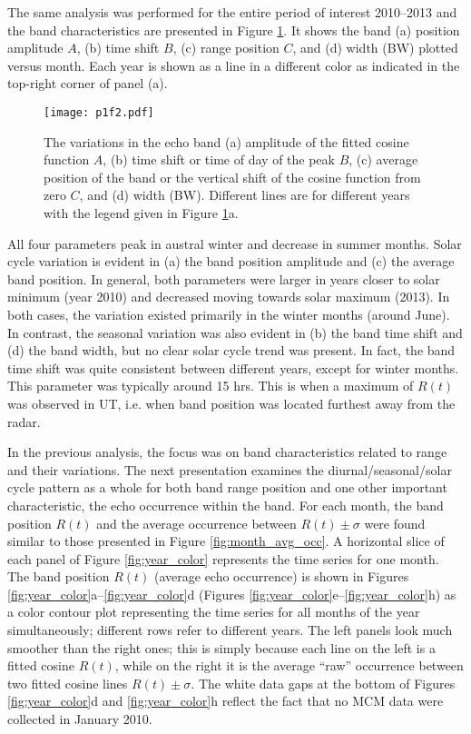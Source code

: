 The same analysis was performed for the entire period of interest 2010--2013 and the band characteristics are presented in Figure \ref{fig:year_line}. It shows the band (a) position amplitude \(A\), (b) time shift \(B\), (c) range position \(C\), and (d) width (BW) plotted versus month.  Each year is shown as a line in a different color as indicated in the top-right corner of panel (a).

\begin{figure}
\texttt{[image: p1f2.pdf]}
\caption{The variations in the echo band (a) amplitude of the fitted cosine function \(A\), (b) time shift or time of day of the peak \(B\), (c) average position of the band or the vertical shift of the cosine function from zero \(C\), and (d) width (BW). Different lines are for different years with the legend given in Figure \ref{fig:year_line}a.}
\label{fig:year_line}
\end{figure}

All four parameters peak in austral winter and decrease in summer months. Solar cycle variation is evident in (a) the band position amplitude and (c) the average band position. In general, both parameters were larger in years closer to solar minimum (year 2010) and decreased moving towards solar maximum (2013).  In both cases, the variation existed primarily in the winter months (around June). In contrast, the seasonal variation was also evident in (b) the band time shift and (d) the band width, but no clear solar cycle trend was present. In fact, the band time shift was quite consistent between different years, except for winter months. This parameter was typically around 15 hrs. This is when a maximum of \(R\left(t\right)\) was observed in UT, i.e. when band position was located furthest away from the radar.

In the previous analysis, the focus was on band characteristics related to range and their variations. The next presentation examines the diurnal/seasonal/solar cycle pattern as a whole for both band range position and one other important characteristic, the echo occurrence within the band. For each month, the band position \(R\left(t\right)\) and the average occurrence between \(R\left(t\right)\pm \sigma\) were found similar to those presented in Figure \ref{fig:month_avg_occ}. A horizontal slice of each panel of Figure \ref{fig:year_color} represents the time series for one month. The band position \(R\left(t\right)\) (average echo occurrence) is shown in Figures \ref{fig:year_color}a--\ref{fig:year_color}d (Figures \ref{fig:year_color}e--\ref{fig:year_color}h) as a color contour plot representing the time series for all months of the year simultaneously; different rows refer to  different years. The left panels look much smoother than the right ones; this is simply because each line on the left is a fitted cosine \(R\left(t\right)\), while on the right it is the average ``raw'' occurrence between two fitted cosine lines \(R\left(t\right)\pm \sigma\). The white data gaps at the bottom of Figures \ref{fig:year_color}d and \ref{fig:year_color}h reflect the fact that no MCM data were collected in January 2010.
	

